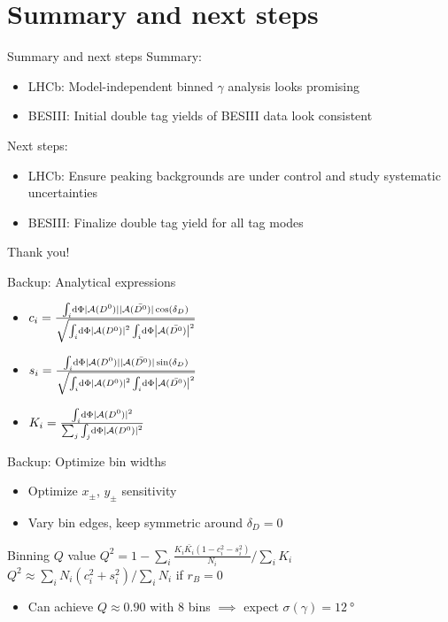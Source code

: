 \documentclass{beamer}
\begin{document}
\section{Summary and next steps}
\begin{frame}{Summary and next steps}
  Summary:
  \begin{itemize}
    \setlength\itemsep{1.0em}
    \item{LHCb: Model-independent binned $\gamma$ analysis looks promising}
    \item{BESIII: Initial double tag yields of BESIII data look consistent}
  \end{itemize}
  \vspace{0.3cm}
  Next steps:
  \begin{itemize}
    \setlength\itemsep{1.0em}
    \item{LHCb: Ensure peaking backgrounds are under control and study systematic uncertainties}
    \item{BESIII: Finalize double tag yield for all tag modes}
  \end{itemize}
  \vspace{0.5cm}
  \begin{center}
    {\huge Thank you!}
  \end{center}
\end{frame}

\begin{frame}{Backup: Analytical expressions}
  \begin{itemize}
    \setlength\itemsep{1.5em}
    \item{$c_i = \frac{\int_i\dd{\Phi}|\mathcal{A}(D^0)||\mathcal{A}(\bar{D^0})|\cos(\delta_D)}{\sqrt{\int_i\dd{\Phi}\abs{\mathcal{A}(D^0)}^2\int_i\dd{\Phi}\abs{\mathcal{A}(\bar{D^0})}^2}}$}
    \item{$s_i = \frac{\int_i\dd{\Phi}|\mathcal{A}(D^0)||\mathcal{A}(\bar{D^0})|\sin(\delta_D)}{\sqrt{\int_i\dd{\Phi}\abs{\mathcal{A}(D^0)}^2\int_i\dd{\Phi}\abs{\mathcal{A}(\bar{D^0})}^2}}$}
    \item{$K_i = \frac{\int_i\dd{\Phi}|\mathcal{A}(D^0)|^2}{\sum_j\int_j\dd{\Phi}\abs{\mathcal{A}(D^0)}^2}$}
  \end{itemize}
\end{frame}

\begin{frame}{Backup: Optimize bin widths}
  \begin{itemize}
    \item{Optimize $x_\pm$, $y_\pm$ sensitivity}
    \item{Vary bin edges, keep symmetric around $\delta_D = 0$}
  \end{itemize}
  \begin{block}{Binning $Q$ value}
    $Q^2 = 1 - \sum_i\frac{K_i\bar{K_i}(1 - c_i^2 - s_i^2)}{N_i}\Big/\sum_iK_i$ \\
    $Q^2\approx\sum_iN_i(c_i^2 + s_i^2)\Big/\sum_iN_i$ if $r_B = 0$
  \end{block}
  \begin{itemize}
    \item{Can achieve $Q\approx0.90$ with $8$ bins $\implies$ expect $\sigma(\gamma) = \SI{12}{\degree}$}
  \end{itemize}
\end{frame}
\end{document}
